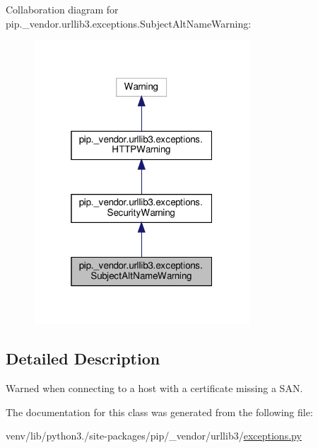 Collaboration diagram for pip.\+\_\+vendor.\+urllib3.\+exceptions.\+Subject\+Alt\+Name\+Warning\+:
\nopagebreak
\begin{figure}[H]
\begin{center}
\leavevmode
\includegraphics[width=229pt]{classpip_1_1__vendor_1_1urllib3_1_1exceptions_1_1SubjectAltNameWarning__coll__graph}
\end{center}
\end{figure}


\subsection{Detailed Description}
\begin{DoxyVerb}Warned when connecting to a host with a certificate missing a SAN.\end{DoxyVerb}
 

The documentation for this class was generated from the following file\+:\begin{DoxyCompactItemize}
\item 
venv/lib/python3./site-\/packages/pip/\+\_\+vendor/urllib3/\hyperlink{pip_2__vendor_2urllib3_2exceptions_8py}{exceptions.\+py}\end{DoxyCompactItemize}
